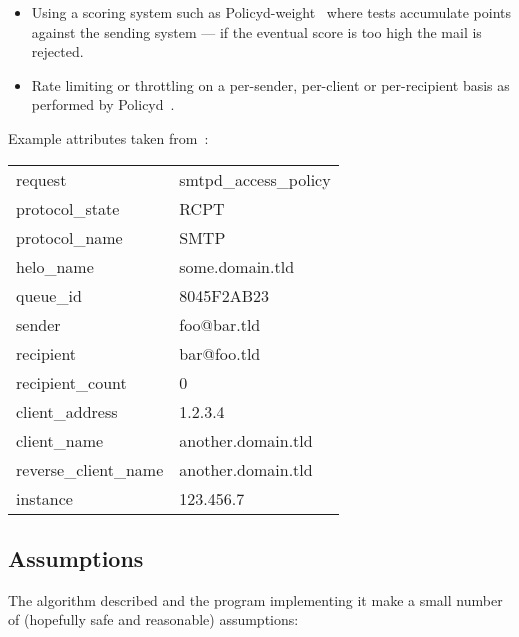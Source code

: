 \documentclass[a4paper,12pt,draft]{article}
\begin{document}
\begin{itemize}
    \item Using a scoring system such as
        Policyd-weight~\cite{policyd-weight} where tests accumulate points
        against the sending system --- if the eventual score is too high
        the mail is rejected.

    \item Rate limiting or throttling on a per-sender, per-client or
        per-recipient basis as performed by Policyd~\cite{policyd}.

\end{itemize}

Example attributes taken from~\cite{policy-servers}:

\begin{tabular}[]{ll}

    request                 & smtpd\_access\_policy     \\
    protocol\_state         & RCPT                      \\
    protocol\_name          & SMTP                      \\
    helo\_name              & some.domain.tld           \\
    queue\_id               & 8045F2AB23                \\
    sender                  & foo@bar.tld               \\
    recipient               & bar@foo.tld               \\
    recipient\_count        & 0                         \\
    client\_address         & 1.2.3.4                   \\
    client\_name            & another.domain.tld        \\
    reverse\_client\_name   & another.domain.tld        \\
    instance                & 123.456.7                 \\

\end{tabular}



\subsection{Assumptions}

The algorithm described and the program implementing it make a small number
of (hopefully safe and reasonable) assumptions:
\end{document}
